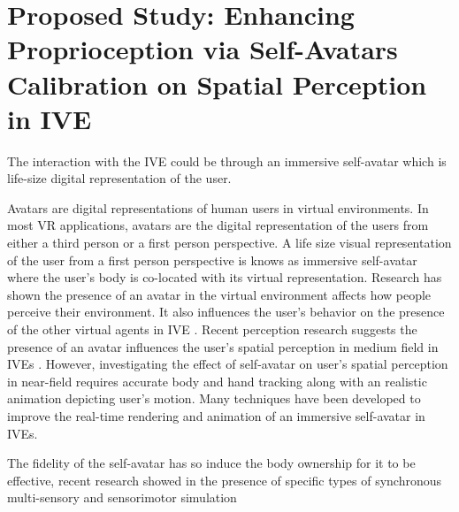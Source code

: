 
\chapter{Proposed Study: Enhancing Proprioception via Self-Avatars Calibration on Spatial Perception in IVE}

The interaction with the IVE could be through an immersive self-avatar which is life-size digital representation of the user. 

Avatars are digital representations of human users in virtual environments. In most VR applications, avatars are the digital representation of the users from either a third person or a first person perspective. A life size visual representation of the user from a first person perspective is knows as immersive self-avatar where the user's body is co-located with its virtual representation. Research has shown the presence of an avatar in the virtual environment affects how people perceive their environment. It also influences the user's behavior on the presence of the other virtual agents in IVE \cite{HUH10,SAD+06,ZUG+07}. Recent perception research suggests the presence of an avatar influences the user's spatial perception in medium field in IVEs \cite{MCW+10,LNW+03,WJS+08}. However, investigating the effect of self-avatar on user's spatial perception in near-field requires accurate body and hand tracking along with an realistic animation depicting user's motion. Many techniques have been developed to improve the real-time rendering and animation of an immersive self-avatar in IVEs. 



The fidelity of the self-avatar has so
induce the body ownership for it to be effective, recent research showed in the presence of specific types of synchronous multi-sensory and sensorimotor simulation \cite{SPD+09,SPD+08} 




